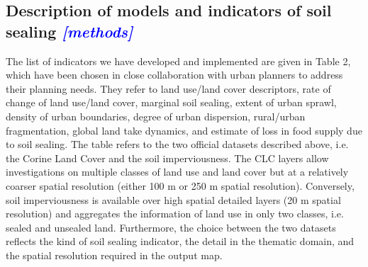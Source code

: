 \documentclass[APA,LATO1COL,doublespace]{WileyNJD-v2}
\newcommand{\update}[1]{\emph{\textcolor{blue}{#1}}}     %
\begin{document}
\subsection{Description of models and indicators of soil sealing \update{[methods]}}
The list of indicators we have developed and implemented are given in Table 2, which have been chosen in close collaboration with urban planners to address their planning needs. 
They refer to land use/land cover descriptors, rate of change of land use/land cover, marginal soil sealing, extent of urban sprawl, density of urban boundaries, degree of urban dispersion, rural/urban fragmentation, global land take dynamics, and estimate of loss in food supply due to soil sealing. 
The table refers to the two official datasets described above, i.e. the Corine Land Cover and the soil imperviousness. 
The CLC layers allow investigations on multiple classes of land use and land cover but at a relatively coarser spatial resolution (either 100 m or 250 m spatial resolution).
Conversely, soil imperviousness is available over high spatial detailed layers (20 m spatial resolution) and aggregates the information of land use in only two classes, i.e. sealed and unsealed land. 
Furthermore, the choice between the two datasets reflects the kind of soil sealing indicator, the detail in the thematic domain, and the spatial resolution required in the output map. 
\end{document}
